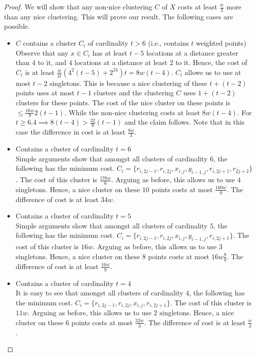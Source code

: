 \documentclass[letterpaper,12pt,titlepage,oneside,final]{book}
\begin{document}
\begin{proof}
We will show that any non-nice clustering $C$ of $X$ costs at least $\frac{w}{3}$ more than any nice clustering. This will prove our result. The following cases are possible.

\begin{itemize}[nolistsep,leftmargin=*]
\item $C$ contains a cluster $C_i$ of cardinality $t > 6$ (i.e., contains $t$ weighted points)\\
Observe that any $x \in C_i$ has at least $t-5$ locations at a distance greater than 4 to it, and $4$ locations at a distance at least $2$ to it. Hence, the cost of $C_i$ is at least $\frac{w}{2t}(4^2(t-5)+2^24)t = 8w(t-4)$. $C_i$ allows us to use at most $t-2$ singletons. This is because a nice clustering of these $t+(t-2)$ points uses at most $t-1$ clusters and the clustering $C$ uses  $1 + (t-2)$ clusters for these points. The cost of the nice cluster on these points is $\le \frac{16w}{9}2(t-1)$. While the non-nice clustering costs at least $8w(t-4)$. For $t \ge 6.4 \implies 8(t-4) > \frac{32}{9}(t-1)$ and the claim follows. Note that in this case the difference in cost is at least $\frac{8w}{3}$. 

\item Contains a cluster of cardinality $t = 6$\\
Simple arguments show that amongst all clusters of cardinality $6$, the following has the minimum cost. $C_i = \{r_{i, 2j-1}, r_{i, 2j}, x_{i,j}, y_{i-1, j}, r_{i, 2j+1}, r_{2j+2}\}$. The cost of this cluster is $\frac{176w}{6}$. Arguing as before, this allows us to use $4$ singletons. Hence, a nice cluster on these $10$ points costs at most $\frac{160w}{9}$. The difference of cost is at least $34w$.  

\item Contains a cluster of cardinality $t = 5$\\
Simple arguments show that amongst all clusters of cardinality $5$, the following has the minimum cost. $C_i = \{r_{i, 2j-1}, r_{i, 2j}, x_{i,j}, y_{i-1, j}, r_{i, 2j+1}\}$. The cost of this cluster is $16w$. Arguing as before, this allows us to use $3$ singletons. Hence, a nice cluster on these $8$ points costs at most $16w\frac{8}{9}$. The difference of cost is at least $\frac{16w}{9}$.  

\item Contains a cluster of cardinality $t = 4$\\
It is easy to see that amongst all clusters of cardinality $4$, the following has the minimum cost. $C_i = \{r_{i, 2j-1}, r_{i, 2j}, x_{i,j}, r_{i, 2j+1}\}$. The cost of this cluster is $11w$. Arguing as before, this allows us to use $2$ singletons. Hence, a nice cluster on these $6$ points costs at most $\frac{32w}{3}$. The difference of cost is at least $\frac{w}{3}$.


\end{itemize}
\end{proof}
\end{document}
